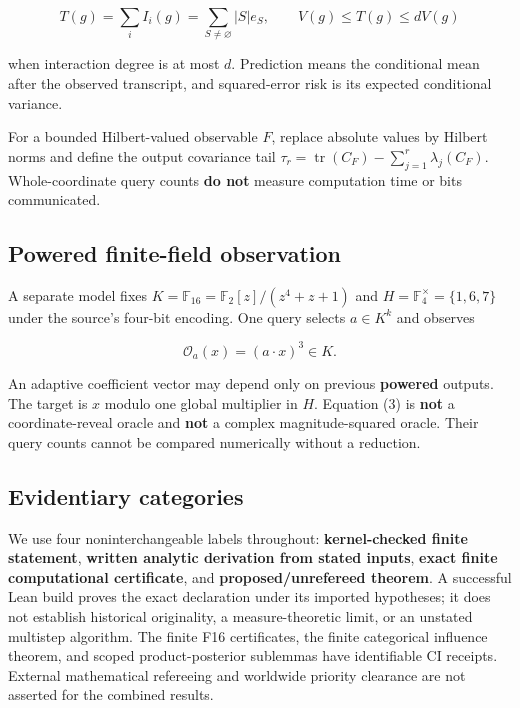 \documentclass[
  10pt,
]{article}
\begin{document}
\[
T(g)=\sum_i I_i(g)=\sum_{S\ne\varnothing}|S|e_S,
\qquad V(g)\le T(g)\le dV(g) \tag{2}
\]

when interaction degree is at most \(d\). Prediction means the
conditional mean after the observed transcript, and squared-error risk
is its expected conditional variance.

For a bounded Hilbert-valued observable \(F\), replace absolute values
by Hilbert norms and define the output covariance tail
\(\tau_r=\operatorname{tr}(C_F)-\sum_{j=1}^{r}\lambda_j(C_F)\).
Whole-coordinate query counts \textbf{do not} measure computation time
or bits communicated.

\subsection{Powered finite-field
observation}\label{powered-finite-field-observation}

A separate model fixes \(K=\mathbb F_{16}=\mathbb F_2[z]/(z^4+z+1)\) and
\(H=\mathbb F_4^\times=\{1,6,7\}\) under the source's four-bit encoding.
One query selects \(a\in K^k\) and observes

\[
\mathcal O_a(x)=(a\cdot x)^3\in K. \tag{3}
\]

An adaptive coefficient vector may depend only on previous
\textbf{powered} outputs. The target is \(x\) modulo one global
multiplier in \(H\). Equation (3) is \textbf{not} a coordinate-reveal
oracle and \textbf{not} a complex magnitude-squared oracle. Their query
counts cannot be compared numerically without a reduction.

\subsection{Evidentiary categories}\label{evidentiary-categories}

We use four noninterchangeable labels throughout: \textbf{kernel-checked
finite statement}, \textbf{written analytic derivation from stated
inputs}, \textbf{exact finite computational certificate}, and
\textbf{proposed/unrefereed theorem}. A successful Lean build proves the
exact declaration under its imported hypotheses; it does not establish
historical originality, a measure-theoretic limit, or an unstated
multistep algorithm. The finite F16 certificates, the finite categorical
influence theorem, and scoped product-posterior sublemmas have
identifiable CI receipts. External mathematical refereeing and worldwide
priority clearance are not asserted for the combined results.
\end{document}
